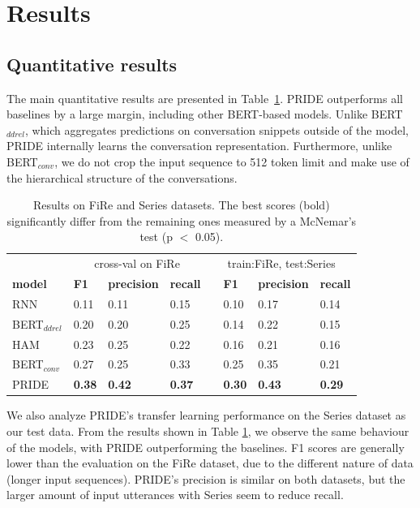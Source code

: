 \section{Results}

\subsection{Quantitative results}
The main quantitative results are presented in \mbox{Table \ref{tab:main_exp}}. PRIDE outperforms all baselines by a large margin, including other BERT-based models.
Unlike BERT$_{ddrel}$, which aggregates predictions on conversation snippets outside of the model, PRIDE internally learns the conversation representation.
Furthermore, unlike BERT$_{conv}$, we do not crop the input sequence to 512 token limit and make use of the hierarchical structure of the conversations.

\begin{table}[]
\centering
\begin{adjustbox}{width=0.7\textwidth}
\begin{tabular}{@{}llllllll@{}}
 & \multicolumn{3}{c}{cross-val on FiRe} & \multicolumn{4}{c}{train:FiRe, test:Series} \\
 \cmidrule(lr){2-4} \cmidrule(lr){5-8}
\textbf{model}           & \textbf{F1}   & \textbf{precision} & \textbf{recall} & &  \textbf{F1}   & \textbf{precision} & \textbf{recall} \\ \toprule
RNN             & 0.11 & 0.11      & 0.15  & & 0.10 & 0.17 & 0.14 \\
BERT$_{ddrel}$ & 0.20 & 0.20      & 0.25   & & 0.14 & 0.22 & 0.15 \\
HAM             & 0.23 & 0.25      & 0.22  & & 0.16 & 0.21 & 0.16 \\
BERT$_{conv}$  & 0.27 & 0.25      & 0.33   & & 0.25 & 0.35 & 0.21 \\ \midrule
PRIDE           & \textbf{0.38} & \textbf{0.42}      & \textbf{0.37} & & \textbf{0.30} & \textbf{0.43}      & \textbf{0.29}\\
\end{tabular}
\end{adjustbox}
\caption[Results on FiRe and Series datasets for relationship prediction.]{Results on FiRe and Series datasets. The best scores (bold) significantly differ from the remaining ones measured by a McNemar’s test (p $<$ 0.05).}
\label{tab:main_exp}
\end{table}

We also analyze PRIDE's transfer learning performance on the Series dataset as our test data. 
From the results shown in Table \ref{tab:main_exp}, we observe the same behaviour of the models, with PRIDE outperforming the baselines. 
F1 scores are generally lower than the evaluation on the FiRe dataset, 
due to the different nature of data (longer input sequences). 
PRIDE's precision is similar on both datasets, but the larger amount of input utterances with Series seem to reduce recall.

